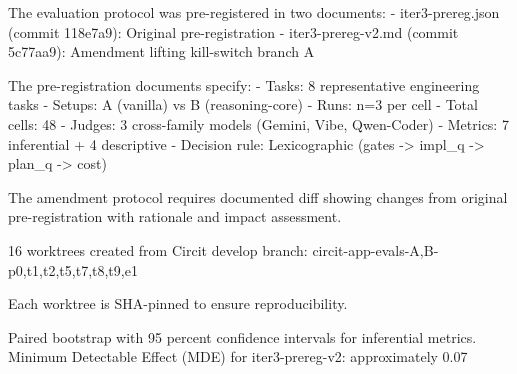 

The evaluation protocol was pre-registered in two documents:
- iter3-prereg.json (commit 118e7a9): Original pre-registration
- iter3-prereg-v2.md (commit 5c77aa9): Amendment lifting kill-switch branch A


The pre-registration documents specify:
- Tasks: 8 representative engineering tasks
- Setups: A (vanilla) vs B (reasoning-core)
- Runs: n=3 per cell
- Total cells: 48
- Judges: 3 cross-family models (Gemini, Vibe, Qwen-Coder)
- Metrics: 7 inferential + 4 descriptive
- Decision rule: Lexicographic (gates -> impl_q -> plan_q -> cost)


The amendment protocol requires documented diff showing changes from original pre-registration with rationale and impact assessment.


16 worktrees created from Circit develop branch:
circit-app-evals-{A,B}-{p0,t1,t2,t5,t7,t8,t9,e1}

Each worktree is SHA-pinned to ensure reproducibility.


Paired bootstrap with 95 percent confidence intervals for inferential metrics.
Minimum Detectable Effect (MDE) for iter3-prereg-v2: approximately 0.07

